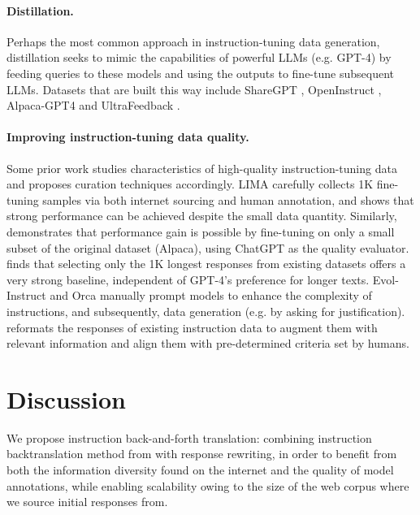 \paragraph{Distillation.} Perhaps the most common approach in instruction-tuning data generation, distillation seeks to mimic the capabilities of powerful LLMs (e.g. GPT-4) by feeding queries to these models and using the outputs to fine-tune subsequent LLMs. Datasets that are built this way include ShareGPT \cite{vicuna2023}, OpenInstruct \cite{wang2023far}, Alpaca-GPT4 \cite{peng2023instruction} and UltraFeedback \cite{tunstall2023zephyr}.
\vspace{-0.25em}
\paragraph{Improving instruction-tuning data quality.} Some prior work studies characteristics of high-quality instruction-tuning data \cite{liu2023makes} and proposes curation techniques accordingly. LIMA \cite{zhou2024lima} carefully collects 1K fine-tuning samples via both internet sourcing and human annotation, and shows that strong performance can be achieved despite the small data quantity. Similarly, \citet{chen2023alpagasus} demonstrates that performance gain is possible by fine-tuning on only a small subset of the original dataset (Alpaca), using ChatGPT as the quality evaluator. \citet{zhao2024long} finds that selecting only the 1K longest responses from existing datasets offers a very strong baseline, independent of GPT-4's preference for longer texts. Evol-Instruct \cite{xu2023wizardlm} and Orca \cite{mukherjee2023orca} manually prompt models to enhance the complexity of instructions, and subsequently, data generation (e.g. by asking for justification). \citet{fan2024reformatted} reformats the responses of existing instruction data to augment them with relevant information and align them with pre-determined criteria set by humans.
\vspace{-0.25em}
\section{Discussion}
We propose instruction back-and-forth translation: combining instruction backtranslation method from \citet{li2023self} with response rewriting, in order to benefit from both the information diversity found on the internet and the quality of model annotations, while enabling scalability owing to the size of the web corpus where we source initial responses from. 
\vspace{-1.5em}
